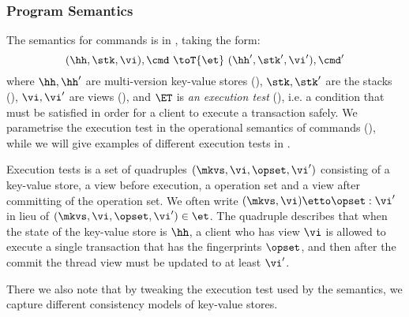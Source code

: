 \subsubsection{Program Semantics}
\label{sec:prog-semantics}

The semantics for commands is in , taking the form:
\[
    ( \hh, \stk, \vi ), \cmd \ \toT{\et} \ ( \hh', \stk', \vi' ) , \cmd'
\]
where \( \hh, \hh' \) are multi-version key-value stores (), \( \stk, \stk'\) are the stacks (), \( \vi, \vi'\) are views (), and $\ET$ is \emph{an execution test} (), i.e. a condition that must be satisfied in order for a client to execute a transaction safely. 
We parametrise the execution test in the operational semantics of commands (), while we will give examples of different execution tests in . 

Execution tests is a set of quadruples \( (\mkvs, \vi, \opset, \vi') \) consisting of a key-value store, a view before execution, a operation set and a view after committing of the operation set. 
We often write \( (\mkvs, \vi) \etto \opset : \vi'\) in lieu of \( (\mkvs, \vi, \opset, \vi') \in \et\).
The quadruple describes that when the state of the key-value store is \( \hh \), a client who has view \( \vi \) is allowed to execute a single transaction that has  the fingerprints \( \opset \), and then after the commit the thread view must be updated to at least \( \vi' \).

\ac{
There we also note that by tweaking the execution test used by the 
semantics, we capture different consistency models of 
key-value stores.
}

